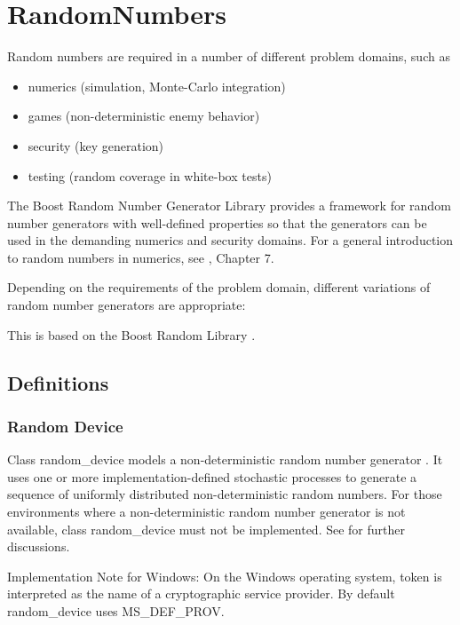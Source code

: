 


\chapter{RandomNumbers}
\label{RandomNumbers} 


Random numbers are required in a number of different problem domains, such as  

\begin{itemize}
	\item numerics (simulation, Monte-Carlo integration)  
	\item games (non-deterministic enemy behavior) 
	\item security (key generation) 
	\item testing (random coverage in white-box tests)
\end{itemize}

The Boost Random Number Generator Library provides a framework for random number generators with well-defined 
properties so that the generators can be used in the demanding numerics and security domains. For a general introduction 
to random numbers in numerics, see  \cite{NumericalRecipes_2007}, Chapter 7.


Depending on the requirements of the problem domain, different variations of random number generators are appropriate:  

This is based on the Boost Random Library \cite{boost_random}.

\section{Definitions}

\subsection{Random Device}
Class random\_device models a non-deterministic random number generator . It uses one or more implementation-defined 
stochastic processes to generate a sequence of uniformly distributed non-deterministic random numbers. For those 
environments where a non-deterministic random number generator is not available, class random\_device must not be 
implemented. See \cite{Eastlake_1994} for further discussions. 

Implementation Note for Windows: On the Windows operating system, token is interpreted as the name of a cryptographic service provider. By default 
random\_device uses MS\_DEF\_PROV. 


